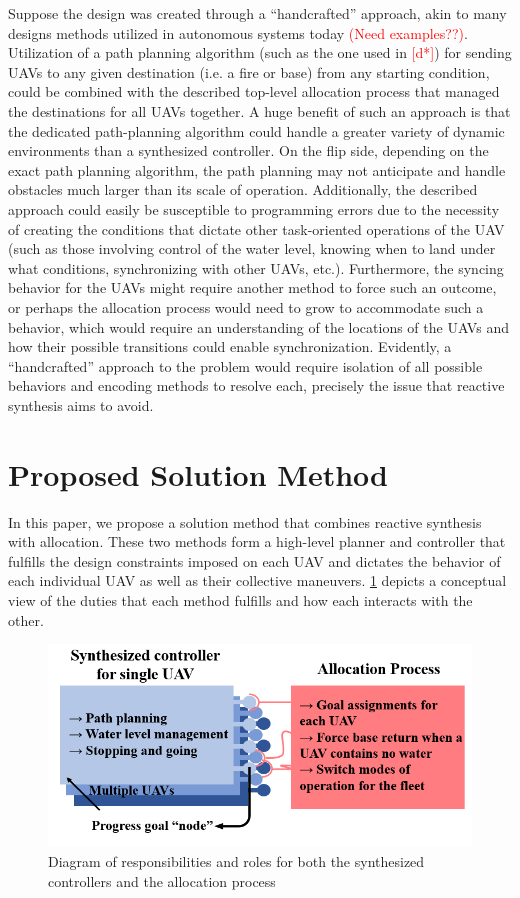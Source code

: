 \documentclass[journal]{IEEEtran}
\begin{document}
Suppose the design was created through a “handcrafted” approach, akin to many designs methods utilized in autonomous systems today \textcolor{red}{(Need examples??)}. Utilization of a path planning algorithm (such as the one used in \textcolor{red}{[d*]}) for sending UAVs to any given destination (i.e. a fire or base) from any starting condition, could be combined with the described top-level allocation process that managed the destinations for all UAVs together. A huge benefit of such an approach is that the dedicated path-planning algorithm could handle a greater variety of dynamic environments than a synthesized controller. On the flip side, depending on the exact path planning algorithm, the path planning may not anticipate and handle obstacles much larger than its scale of operation. Additionally, the described approach could easily be susceptible to programming errors due to the necessity of creating the conditions that dictate other task-oriented operations of the UAV (such as those involving control of the water level, knowing when to land under what conditions, synchronizing with other UAVs, etc.). Furthermore, the syncing behavior for the UAVs might require another method to force such an outcome, or perhaps the allocation process would need to grow to accommodate such a behavior, which would require an understanding of the locations of the UAVs and how their possible transitions could enable synchronization. Evidently, a “handcrafted” approach to the problem would require isolation of all possible behaviors and encoding methods to resolve each, precisely the issue that reactive synthesis aims to avoid.

\section{Proposed Solution Method}
In this paper, we propose a solution method that combines reactive synthesis with allocation. These two methods form a high-level planner and controller that fulfills the design constraints imposed on each UAV and dictates the behavior of each individual UAV as well as their collective maneuvers. \ref{RHAlloc} depicts a conceptual view of the duties that each method fulfills and how each interacts with the other.

 \begin{figure}
	\includegraphics[width = 0.8 \linewidth]{RHandAllocationDesc}
	\centering
	\caption{Diagram of responsibilities and roles for both the synthesized controllers and the allocation process}
	\label{RHAlloc}
\end{figure}
\end{document}
